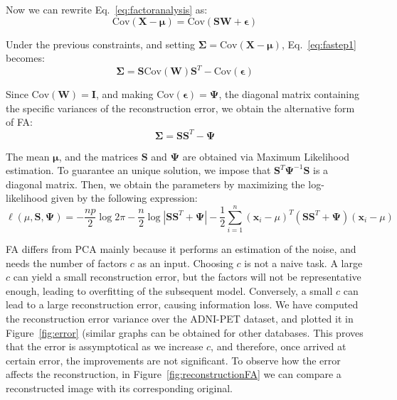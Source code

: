 Now we can rewrite Eq.~\ref{eq:factoranalysis} as:
\begin{equation}\label{eq:fastep1}
	\text{Cov}(\mathbf{X} -\boldsymbol{\mu})= \text{Cov}(\mathbf{S}\mathbf{W} +  \boldsymbol{\epsilon})
\end{equation} 

Under the previous constraints, and setting $\boldsymbol{\Sigma} = \text{Cov}(\mathbf{X} -\boldsymbol{\mu})$, Eq.~\ref{eq:fastep1} becomes:
\begin{equation}
	\boldsymbol{\Sigma} = \mathbf{S}\text{Cov}(\mathbf{W})\mathbf{S}^T - \text{Cov}(\boldsymbol{\epsilon})
\end{equation}

Since $\text{Cov}(\mathbf{W}) = \mathbf{I}$, and making $\text{Cov}(\boldsymbol{\epsilon})=\boldsymbol{\Psi}$, the diagonal matrix containing the specific variances of the reconstruction error, we obtain the alternative form of \ac{FA}: 
\begin{equation}
\boldsymbol{\Sigma} = \mathbf{S}\mathbf{S}^T - \boldsymbol{\Psi}
\end{equation}

The mean $\boldsymbol{\mu}$, and the matrices $\mathbf{S}$ and $\boldsymbol{\Psi}$ are obtained via Maximum Likelihood estimation. To guarantee an unique solution, we impose that $\mathbf{S}^T\boldsymbol{\Psi}^{-1}\mathbf{S}$ is a diagonal matrix. Then, we obtain the parameters by maximizing the log-likelihood given by the following expression: 
\begin{equation}
	\ell(\mu,\mathbf{S},\boldsymbol{\Psi}) = - \frac{np}{2}\log{2\pi}- \frac{n}{2}\log{\left|\mathbf{SS}^T + \boldsymbol{\Psi}\right|} - \frac{1}{2}\sum_{i=1}^{n}(\mathbf{x}_i-\mu)^T(\mathbf{SS}^T+\boldsymbol{\Psi})(\mathbf{x}_i-\mu)
\end{equation} 

\ac{FA} differs from \ac{PCA} mainly because it performs an estimation of the noise, and needs the number of factors $c$ as an input. Choosing $c$ is not a naive task. A large $c$ can yield a small reconstruction error, but the factors will not be representative enough, leading to overfitting of the subsequent model. Conversely, a small $c$ can lead to a large reconstruction error, causing information loss. We have computed the reconstruction error variance over the ADNI-PET dataset, and plotted it in Figure~\ref{fig:error} (similar graphs can be obtained for other databases. This proves that the error is assymptotical as we increase $c$, and therefore, once arrived at certain error, the improvements are not significant. To observe how the error affects the reconstruction, in Figure~\ref{fig:reconstructionFA} we can compare a reconstructed image with its corresponding original. 

